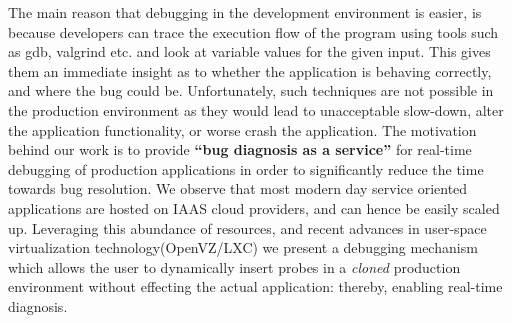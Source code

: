 


The main reason that debugging in the development environment is easier, is because developers can trace the execution flow of the program using tools such as gdb\cite{gdb}, valgrind\cite{valgrind} etc. and look at variable values for the given input. 
This gives them an immediate insight as to whether the application is behaving correctly, and where the bug could be.
Unfortunately, such techniques are not possible in the production environment as they would lead to unacceptable slow-down, alter the application functionality, or worse crash the application.
The motivation behind our work is to provide \textbf{``bug diagnosis as a service''} for real-time debugging of production applications in order to significantly reduce the time towards bug resolution.
We observe that most modern day service oriented applications are hosted on IAAS cloud providers, and can hence be easily scaled  up. 
Leveraging this abundance of resources, and recent advances in user-space virtualization technology(OpenVZ/LXC\cite{openvz,lxc}) we present a debugging mechanism which allows the user to dynamically insert probes in a \emph{cloned} production environment without effecting the actual application: thereby, enabling real-time diagnosis.

